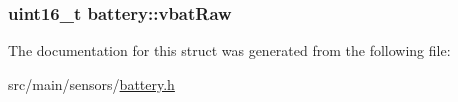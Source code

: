 \hypertarget{structbattery_a02d5b3fa6e42d5a6694e491f39ca27ef}{
\subsubsection[{vbat\+Raw}]{\setlength{\rightskip}{0pt plus 5cm}uint16\+\_\+t battery\+::vbat\+Raw}}\label{structbattery_a02d5b3fa6e42d5a6694e491f39ca27ef}


The documentation for this struct was generated from the following file\+:\begin{DoxyCompactItemize}
\item 
src/main/sensors/\hyperlink{sensors_2battery_8h}{battery.\+h}\end{DoxyCompactItemize}
